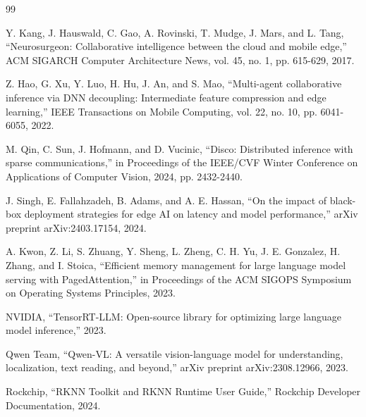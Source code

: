 \documentclass[10pt,a4paper,twocolumn]{ctexart}
\begin{document}
\begin{thebibliography}{99}

 Y. Kang, J. Hauswald, C. Gao, A. Rovinski, T. Mudge, J. Mars, and L. Tang, “Neurosurgeon: Collaborative intelligence between the cloud and mobile edge,” ACM SIGARCH Computer Architecture News, vol. 45, no. 1, pp. 615-629, 2017.

 Z. Hao, G. Xu, Y. Luo, H. Hu, J. An, and S. Mao, “Multi-agent collaborative inference via DNN decoupling: Intermediate feature compression and edge learning,” IEEE Transactions on Mobile Computing, vol. 22, no. 10, pp. 6041-6055, 2022.

 M. Qin, C. Sun, J. Hofmann, and D. Vucinic, “Disco: Distributed inference with sparse communications,” in Proceedings of the IEEE/CVF Winter Conference on Applications of Computer Vision, 2024, pp. 2432-2440.

 J. Singh, E. Fallahzadeh, B. Adams, and A. E. Hassan, “On the impact of black-box deployment strategies for edge AI on latency and model performance,” arXiv preprint arXiv:2403.17154, 2024.

 A. Kwon, Z. Li, S. Zhuang, Y. Sheng, L. Zheng, C. H. Yu, J. E. Gonzalez, H. Zhang, and I. Stoica, “Efficient memory management for large language model serving with PagedAttention,” in Proceedings of the ACM SIGOPS Symposium on Operating Systems Principles, 2023.

 NVIDIA, “TensorRT-LLM: Open-source library for optimizing large language model inference,” 2023.

 Qwen Team, “Qwen-VL: A versatile vision-language model for understanding, localization, text reading, and beyond,” arXiv preprint arXiv:2308.12966, 2023.

 Rockchip, “RKNN Toolkit and RKNN Runtime User Guide,” Rockchip Developer Documentation, 2024.

\end{thebibliography}
\end{document}
